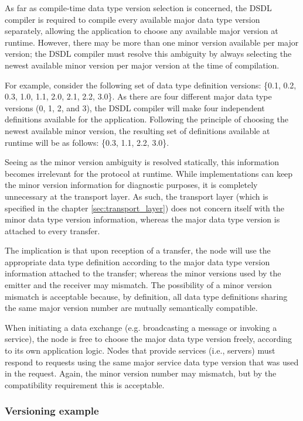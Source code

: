 As far as compile-time data type version selection is concerned,
the DSDL compiler is required to compile every available major data type version separately,
allowing the application to choose any available major version at runtime.
However, there may be more than one minor version available per major version;
the DSDL compiler must resolve this ambiguity by always selecting the newest available minor
version per major version at the time of compilation.

For example, consider the following set of data type definition versions:
\{0.1, 0.2, 0.3, 1.0, 1.1, 2.0, 2.1, 2.2, 3.0\}.
As there are four different major data type versions (0, 1, 2, and 3),
the DSDL compiler will make four independent definitions available for the application.
Following the principle of choosing the newest available minor version,
the resulting set of definitions available at runtime will be as follows:
\{0.3, 1.1, 2.2, 3.0\}.

Seeing as the minor version ambiguity is resolved statically,
this information becomes irrelevant for the protocol at runtime.
While implementations can keep the minor version information for diagnostic purposes,
it is completely unnecessary at the transport layer.
As such, the transport layer (which is specified in the chapter \ref{sec:transport_layer})
does not concern itself with the minor data type version information,
whereas the major data type version is attached to every transfer.

The implication is that upon reception of a transfer, the node will use the appropriate
data type definition according to the major data type version information attached to the
transfer; whereas the minor versions used by the emitter and the receiver may mismatch.
The possibility of a minor version mismatch is acceptable because, by definition,
all data type definitions sharing the same major version number are mutually semantically compatible.

When initiating a data exchange (e.g. broadcasting a message or invoking a service),
the node is free to choose the major data type version freely, according to its own application logic.
Nodes that provide services (i.e., servers) must respond to requests using the same major service data type
version that was used in the request.
Again, the minor version number may mismatch, but by the compatibility requirement this is acceptable.

\subsubsection{Versioning example}

